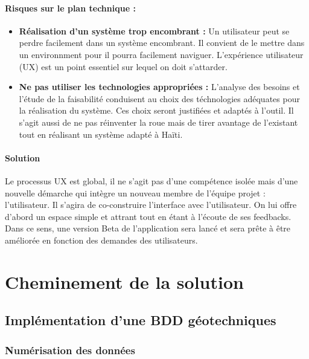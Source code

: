         \paragraph{Risques sur le plan technique :}
        \begin{itemize}
            \item \textbf{Réalisation d'un système trop encombrant :}
            Un utilisateur peut se perdre facilement dans un système encombrant. Il convient de le mettre dans un environnment
            pour il pourra facilement naviguer. L'expérience utilisateur (UX) est un point essentiel sur lequel on doit s'attarder.
            \item \textbf{Ne pas utiliser les technologies appropriées :}
            L'analyse des besoins et l'étude de la faisabilité conduisent au choix des téchnologies adéquates pour la réalisation
            du système. Ces choix seront justifiées et adaptés à l'outil. 
            Il s'agit aussi de ne pas réinventer la roue mais de tirer avantage de l'existant tout en réalisant 
            un système adapté à Haïti.
        \end{itemize}
        \paragraph{Solution}
        Le processus UX est global, il ne s’agit pas d’une compétence isolée mais d’une nouvelle 
        démarche qui intègre un nouveau membre de l’équipe projet : l’utilisateur. \cite{Schaudel2020}
        Il s'agira de co-construire l'interface avec l'utilisateur. On lui offre d'abord un espace simple et attrant
        tout en étant à l'écoute de ses feedbacks. Dans ce sens, une version Beta de l'application sera lancé et sera prête
        à être améliorée en fonction des demandes des utilisateurs.
        \par


    \section{Cheminement de la solution}
        \subsection{Implémentation d'une BDD géotechniques}
            \subsubsection{Numérisation des données}
                
